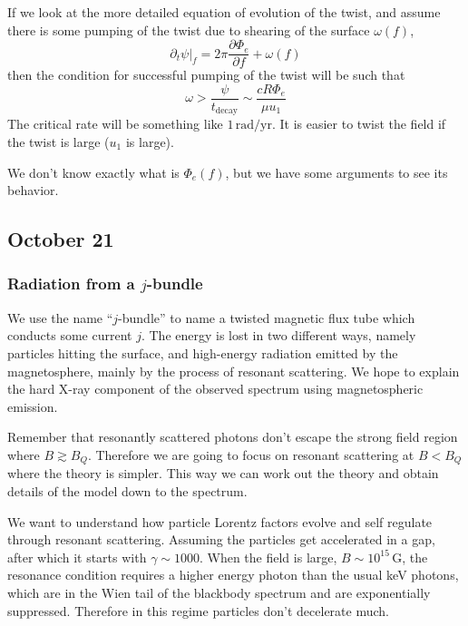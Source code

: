 \documentclass[letterpaper, 11pt]{article}
\numberwithin{equation}{section}
\numberwithin{figure}{section}
\begin{document}
If we look at the more detailed equation of evolution of the twist, and assume there is some pumping of the twist due to shearing of the surface $\omega(f)$,
\begin{equation}
    \label{eq:91}
    \left.\partial_t\psi\right|_f = 2\pi\frac{\partial\Phi_e}{\partial f} + \omega(f)
\end{equation}
then the condition for successful pumping of the twist will be such that
\begin{equation}
    \label{eq:92}
    \omega > \frac{\psi}{t_\mathrm{decay}} \sim \frac{c R\Phi_e}{\mu u_1}
\end{equation}
The critical rate will be something like $1\,\mathrm{rad/yr}$. It is easier to twist the field if the twist is large ($u_1$ is large).

We don't know exactly what is $\Phi_e(f)$, but we have some arguments to see its behavior.

\subsection{October 21}
\label{sec:oct-21}

\subsubsection{Radiation from a $j$-bundle}
\label{sec:radiation}

We use the name ``$j$-bundle'' to name a twisted magnetic flux tube which conducts some current $j$. The energy is lost in two different ways, namely particles hitting the surface, and high-energy radiation emitted by the magnetosphere, mainly by the process of resonant scattering. We hope to explain the hard X-ray component of the observed spectrum using magnetospheric emission.

Remember that resonantly scattered photons don't escape the strong field region where $B\gtrsim B_{Q}$. Therefore we are going to focus on resonant scattering at $B<B_Q$ where the theory is simpler. This way we can work out the theory and obtain details of the model down to the spectrum.

We want to understand how particle Lorentz factors evolve and self regulate through resonant scattering. Assuming the particles get accelerated in a gap, after which it starts with $\gamma \sim 1000$. When the field is large, $B\sim 10^{15}\,\mathrm{G}$, the resonance condition requires a higher energy photon than the usual keV photons, which are in the Wien tail of the blackbody spectrum and are exponentially suppressed. Therefore in this regime particles don't decelerate much.
\end{document}
